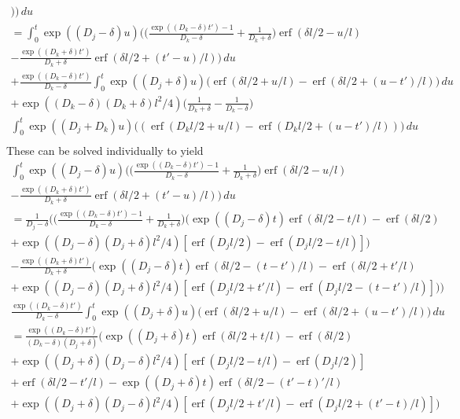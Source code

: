 \documentclass[a4paper]{article}
\newcommand{\erf}{\operatorname{erf}}
\begin{document}
\begin{multline}
  \bigg)
  \bigg) \,du \\
  = 
  \int_0^t \exp((D_j - \delta) u) \bigg(
  \bigg(
  \frac{\exp((D_k-\delta) t') - 1}{D_k-\delta} + \frac{1}{D_k+\delta}
  \bigg)
  \erf(\delta l/2 - u/l) \\
  - \frac{\exp((D_k+\delta)t')}{D_k+\delta} \erf(\delta l/2 + (t' - u)/l) \bigg)\,du \\
  +
  \frac{\exp((D_k-\delta) t')}{D_k-\delta}
  \int_0^t \exp((D_j + \delta) u) \bigg(
  \erf(\delta l/2 + u/l)
  - \erf(\delta l/2 + (u - t')/l) \bigg) \,du \\
  +
  \exp((D_k-\delta)(D_k+\delta)l^2/4)
  \bigg(\frac{1}{D_k+\delta} - \frac{1}{D_k - \delta}\bigg) \\
  \int_0^t \exp((D_j + D_k) u)
  \bigg(
  (\erf(D_k l/2 + u/l) - \erf(D_k l/2  + (u - t')/l) )
  \bigg) \,du \\
\end{multline}
These can be solved individually to yield
\begin{multline}
  \int_0^t \exp((D_j - \delta) u) \bigg(
  \bigg(
  \frac{\exp((D_k-\delta) t') - 1}{D_k-\delta} + \frac{1}{D_k+\delta}
  \bigg)
  \erf(\delta l/2 - u/l) \\
  - \frac{\exp((D_k+\delta)t')}{D_k+\delta} \erf(\delta l/2 + (t' - u)/l) \bigg)\,du \\
  =
  \frac{1}{D_j - \delta} \bigg(
  \bigg(
  \frac{\exp((D_k-\delta) t') - 1}{D_k-\delta} + \frac{1}{D_k+\delta}
  \bigg)
  \bigg(\exp((D_j-\delta) t) \erf(\delta l/2 - t/l) - \erf(\delta l/2)
  \\
  + \exp((D_j - \delta)(D_j + \delta)l^2/4)[\erf(D_j l/2) - \erf(D_j
  l/2 - t/l) ]\bigg)
  \\
  - \frac{\exp((D_k+\delta)t')}{D_k+\delta} \bigg(
  \exp((D_j-\delta) t) \erf(\delta l/2 - (t-t')/l) - \erf(\delta l/2 +
  t'/l) \\
  + \exp((D_j - \delta)(D_j + \delta)l^2/4)[\erf(D_j l/2 + t'/l) - \erf(D_j
  l/2 - (t-t')/l) ]
  \bigg)
  \bigg)
\end{multline}
\begin{multline}
  \frac{\exp((D_k-\delta) t')}{D_k-\delta}
  \int_0^t \exp((D_j + \delta) u) \bigg(
  \erf(\delta l/2 + u/l)
  - \erf(\delta l/2 + (u - t')/l) \bigg) \,du \\
  =
  \frac{\exp((D_k-\delta) t')}{(D_k-\delta)(D_j+\delta)}
  \bigg(
  \exp((D_j + \delta) t) \erf(\delta l/2 + t/l) - \erf(\delta l / 2) \\
  + \exp((D_j + \delta)(D_j - \delta)l^2/4)[\erf(D_j l/2 - t/l) -
  \erf(D_j l/2)] \\
  + \erf(\delta l / 2 - t'/l) - 
  \exp((D_j + \delta) t) \erf(\delta l / 2 - (t'-t)'/l) \\
  + \exp((D_j + \delta)(D_j - \delta)l^2/4)[\erf(D_j l/2 + t'/l) -
  \erf(D_j l/2 + (t'-t)/l)]
  \bigg)
\end{multline}
\end{document}
